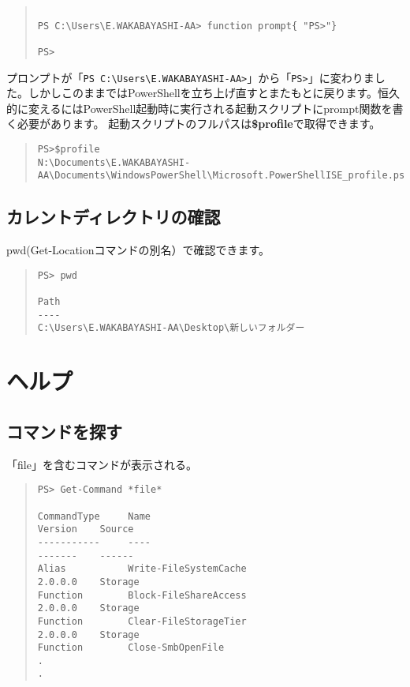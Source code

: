 \documentclass[dvipdfmx]{jsarticle}
\begin{document}
\begin{quote}
\begin{verbatim}

PS C:\Users\E.WAKABAYASHI-AA> function prompt{ "PS>"}

PS>
\end{verbatim}
\end{quote}

プロンプトが「\verb+PS C:\Users\E.WAKABAYASHI-AA>+」から「\verb+PS>+」に変わりました。しかしこのままではPowerShellを立ち上げ直すとまたもとに戻ります。恒久的に変えるにはPowerShell起動時に実行される起動スクリプトにprompt関数を書く必要があります。
起動スクリプトのフルパスは\textbf{\$profile}で取得できます。

\begin{quote}
\begin{verbatim}
PS>$profile
N:\Documents\E.WAKABAYASHI-AA\Documents\WindowsPowerShell\Microsoft.PowerShellISE_profile.ps1
\end{verbatim}
\end{quote}

\subsection{カレントディレクトリの確認}
pwd(Get-Locationコマンドの別名）で確認できます。

\begin{quote}
\begin{verbatim}
PS> pwd

Path                                      
----                                      
C:\Users\E.WAKABAYASHI-AA\Desktop\新しいフォルダー
\end{verbatim}
\end{quote}



\section{ヘルプ}

\subsection{コマンドを探す}

「file」を含むコマンドが表示される。

\begin{quote}
\begin{verbatim}
PS> Get-Command *file*

CommandType     Name                                               Version    Source                       
-----------     ----                                               -------    ------                       
Alias           Write-FileSystemCache                              2.0.0.0    Storage                      
Function        Block-FileShareAccess                              2.0.0.0    Storage                      
Function        Clear-FileStorageTier                              2.0.0.0    Storage                      
Function        Close-SmbOpenFile             
.
.

\end{verbatim}
\end{quote}
\end{document}
